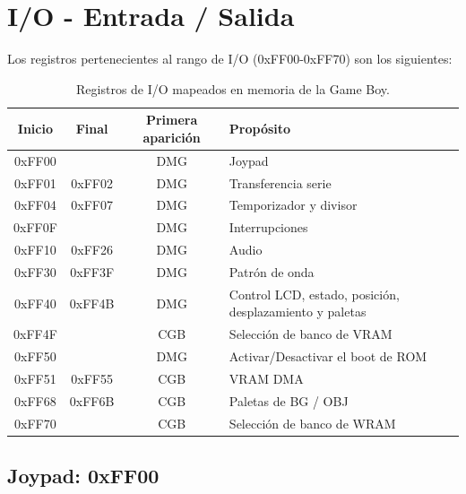 \section{I/O - Entrada / Salida}
Los registros pertenecientes al rango de I/O (0xFF00-0xFF70) son los siguientes:
\begin{table}[H]
    \centering
    \begin{tabular}{|c|c|c|p{5cm}|}
    \hline
    \textbf{Inicio} & \textbf{Final}   & \textbf{Primera aparición} & \textbf{Propósito} \\ \hline
    0xFF00         &                & DMG                     & Joypad \\ \hline
    0xFF01         & 0xFF02         & DMG                     & Transferencia serie \\ \hline
    0xFF04         & 0xFF07         & DMG                     & Temporizador y divisor \\ \hline
    0xFF0F         &                & DMG                     & Interrupciones \\ \hline
    0xFF10         & 0xFF26         & DMG                     & Audio \\ \hline
    0xFF30         & 0xFF3F         & DMG                     & Patrón de onda \\ \hline
    0xFF40         & 0xFF4B         & DMG                     & Control LCD, estado, posición, desplazamiento y paletas \\ \hline
    0xFF4F         &                & CGB                     & Selección de banco de VRAM \\ \hline
    0xFF50         &                & DMG                     & Activar/Desactivar el boot de ROM \\ \hline
    0xFF51         & 0xFF55         & CGB                     & VRAM DMA \\ \hline
    0xFF68         & 0xFF6B         & CGB                     & Paletas de BG / OBJ \\ \hline
    0xFF70         &                & CGB                     & Selección de banco de WRAM \\ \hline
    \end{tabular}
    \caption{Registros de I/O mapeados en memoria de la Game Boy.}
    \label{tab:memory_io_registers}
\end{table}

\clearpage

\subsection{Joypad: 0xFF00}


